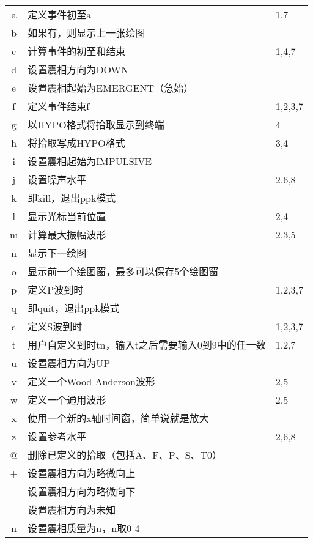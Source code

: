 \begin{center}
\begin{longtable}{cll}
a       &   定义事件初至a                           &   1,7     \\
b       &   如果有，则显示上一张绘图                &           \\
c       &   计算事件的初至和结束                    &   1,4,7   \\
d       &   设置震相方向为DOWN                      &           \\
e       &   设置震相起始为EMERGENT（急始）          &           \\
f       &   定义事件结束f                           &  1,2,3,7  \\
g       &   以HYPO格式将拾取显示到终端              &   4       \\
h       &   将拾取写成HYPO格式                      &   3,4     \\
i       &   设置震相起始为IMPULSIVE                 &           \\
j       &   设置噪声水平                            &   2,6,8   \\
k       &   即kill，退出ppk模式                     &           \\
l       &   显示光标当前位置                        &   2,4     \\
m       &   计算最大振幅波形                        &   2,3,5   \\
n       &   显示下一绘图                            &           \\
o       &   显示前一个绘图窗，最多可以保存5个绘图窗 &           \\
p       &   定义P波到时                             &   1,2,3,7 \\
q       &   即quit，退出ppk模式                     &           \\
s       &   定义S波到时                             &   1,2,3,7 \\
t       &   用户自定义到时tn，输入t之后需要输入0到9中的任一数   &   1,2,7\\
u       &   设置震相方向为UP                        &           \\
v       &   定义一个Wood-Anderson波形               &   2,5     \\
w       &   定义一个通用波形                        &   2,5     \\
x       &   使用一个新的x轴时间窗，简单说就是放大   &           \\
z       &   设置参考水平                            &   2,6,8   \\
@       &   删除已定义的拾取（包括A、F、P、S、T0）  &           \\
+       &   设置震相方向为略微向上                  &           \\
-       &   设置震相方向为略微向下                  &           \\
\lstinline[showspaces]! !   &   设置震相方向为未知  &           \\
n       &   设置震相质量为n，n取0-4                 &           \\
\end{longtable}
\end{center}

